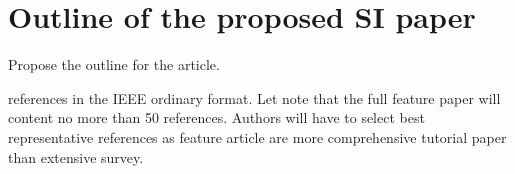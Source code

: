 \documentclass[journal,onecolumn]{IEEEtran}
\begin{document}
\section{Outline of the proposed SI paper}
\label{secpr}
\par Propose the outline for the article.
\begin{thebibliography}{10}
\label{sec:bib}
references in the IEEE ordinary format. Let note that the full feature paper will content no more than 50 references. Authors will have to select best representative references as feature article are more comprehensive tutorial paper than extensive survey.


\end{thebibliography}

\end{document}
